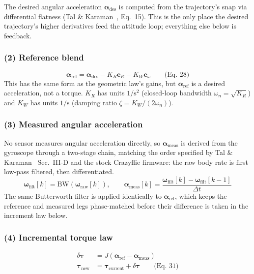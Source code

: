 \documentclass[11pt,a4paper]{article}
\begin{document}
The desired angular acceleration $\boldsymbol{\alpha}_{\mathrm{des}}$ is computed from the
trajectory's snap via differential flatness (Tal \& Karaman~\cite{tal2020}, Eq.~15). This is the
only place the desired trajectory's higher derivatives feed the attitude loop; everything else
below is feedback.

\subsubsection{(2) Reference blend}

\[
  \boldsymbol{\alpha}_{\mathrm{ref}} = \boldsymbol{\alpha}_{\mathrm{des}}
    - K_R \mathbf{e}_R - K_W \mathbf{e}_\omega \qquad \text{(Eq.~28)}
\]
This has the same form as the geometric law's gains, but $\boldsymbol{\alpha}_{\mathrm{ref}}$ is a
desired acceleration, not a torque. $K_R$ has units $1/\mathrm{s}^2$ (closed-loop bandwidth
$\omega_n=\sqrt{K_R}$) and $K_W$ has units $1/\mathrm{s}$ (damping ratio $\zeta=K_W/(2\omega_n)$).

\subsubsection{(3) Measured angular acceleration}

No sensor measures angular acceleration directly, so $\boldsymbol{\alpha}_{\mathrm{meas}}$ is
derived from the gyroscope through a two-stage chain, matching the order specified by Tal \&
Karaman~\cite{tal2020} Sec.~III-D and the stock Crazyflie firmware: the raw body rate is first
low-pass filtered, then differentiated.
\[
  \boldsymbol{\omega}_{\mathrm{filt}}[k] = \mathrm{BW}(\boldsymbol{\omega}_{\mathrm{raw}}[k]),
  \qquad
  \boldsymbol{\alpha}_{\mathrm{meas}}[k] =
    \frac{\boldsymbol{\omega}_{\mathrm{filt}}[k]-\boldsymbol{\omega}_{\mathrm{filt}}[k-1]}{\Delta t}
\]
The same Butterworth filter is applied identically to $\boldsymbol{\alpha}_{\mathrm{ref}}$, which
keeps the reference and measured legs phase-matched before their difference is taken in the
increment law below.

\subsubsection{(4) Incremental torque law}

\begin{align}
  \delta\boldsymbol{\tau} &= J\left(\boldsymbol{\alpha}_{\mathrm{ref}} - \boldsymbol{\alpha}_{\mathrm{meas}}\right) \\
  \boldsymbol{\tau}_{\mathrm{new}} &= \boldsymbol{\tau}_{\mathrm{current}} + \delta\boldsymbol{\tau}
    \qquad \text{(Eq.~31)}
\end{align}
\end{document}
